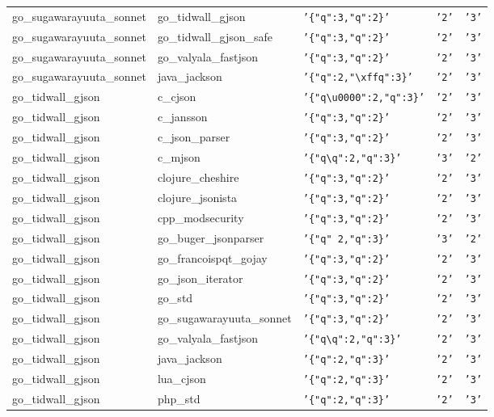 \documentclass[english, 12pt, a4paper, sci, utf8, a-2b, online]{aaltothesis}
\def\str#1{\texttt{'#1'}}
\begin{document}
\begin{longtable}{lllll}
    go\_sugawarayuuta\_sonnet & go\_tidwall\_gjson & \str{\{"q":3,"q":2\}} & \str{2} & \str{3} \\
    go\_sugawarayuuta\_sonnet & go\_tidwall\_gjson\_safe & \str{\{"q":3,"q":2\}} & \str{2} & \str{3} \\
    go\_sugawarayuuta\_sonnet & go\_valyala\_fastjson & \str{\{"q":3,"q":2\}} & \str{2} & \str{3} \\
    go\_sugawarayuuta\_sonnet & java\_jackson & \str{\{"q":2,"\textbackslash xffq":3\}} & \str{2} & \str{3} \\
    go\_tidwall\_gjson & c\_cjson & \str{\{"q\textbackslash u0000":2,"q":3\}} & \str{2} & \str{3} \\
    go\_tidwall\_gjson & c\_jansson & \str{\{"q":3,"q":2\}} & \str{2} & \str{3} \\
    go\_tidwall\_gjson & c\_json\_parser & \str{\{"q":3,"q":2\}} & \str{2} & \str{3} \\
    go\_tidwall\_gjson & c\_mjson & \str{\{"q\textbackslash q":2,"q":3\}} & \str{3} & \str{2} \\
    go\_tidwall\_gjson & clojure\_cheshire & \str{\{"q":3,"q":2\}} & \str{2} & \str{3} \\
    go\_tidwall\_gjson & clojure\_jsonista & \str{\{"q":3,"q":2\}} & \str{2} & \str{3} \\
    go\_tidwall\_gjson & cpp\_modsecurity & \str{\{"q":3,"q":2\}} & \str{2} & \str{3} \\
    go\_tidwall\_gjson & go\_buger\_jsonparser & \str{\{"q" 2,"q":3\}} & \str{3} & \str{2} \\
    go\_tidwall\_gjson & go\_francoispqt\_gojay & \str{\{"q":3,"q":2\}} & \str{2} & \str{3} \\
    go\_tidwall\_gjson & go\_json\_iterator & \str{\{"q":3,"q":2\}} & \str{2} & \str{3} \\
    go\_tidwall\_gjson & go\_std & \str{\{"q":3,"q":2\}} & \str{2} & \str{3} \\
    go\_tidwall\_gjson & go\_sugawarayuuta\_sonnet & \str{\{"q":3,"q":2\}} & \str{2} & \str{3} \\
    go\_tidwall\_gjson & go\_valyala\_fastjson & \str{\{"q\textbackslash q":2,"q":3\}} & \str{2} & \str{3} \\
    go\_tidwall\_gjson & java\_jackson & \str{\{"q":2,"q":3\}} & \str{2} & \str{3} \\
    go\_tidwall\_gjson & lua\_cjson & \str{\{"q":2,"q":3\}} & \str{2} & \str{3} \\
    go\_tidwall\_gjson & php\_std & \str{\{"q":2,"q":3\}} & \str{2} & \str{3} \\

\end{longtable}
\end{document}
